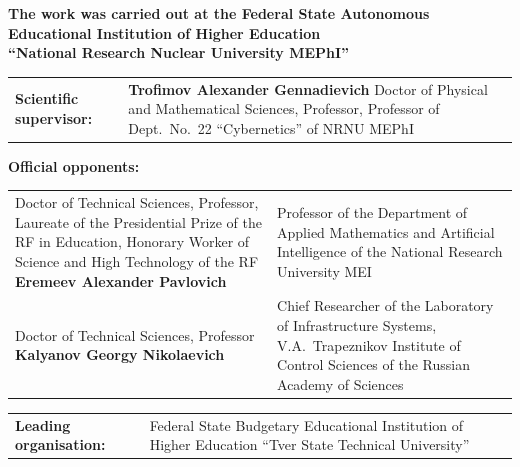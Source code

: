 \documentclass[12pt,a5paper]{article}
\begin{document}
{\footnotesize
\begin{center}
\textbf{The work was carried out at the Federal State Autonomous\\
Educational Institution of Higher Education\\
``National Research Nuclear University MEPhI''}
\end{center}

\vspace{0.2cm}

\noindent\begin{tabular}{@{}p{3cm}p{7.2cm}@{}}
\textbf{Scientific supervisor:} & \textbf{Trofimov Alexander Gennadievich} \newline Doctor of Physical and Mathematical Sciences, Professor, Professor of Dept.\ No.~22 ``Cybernetics'' of NRNU MEPhI \\
\end{tabular}

\vspace{0.2cm}

\noindent\textbf{Official opponents:}
\vspace{0.05cm}

\noindent\begin{tabular}{@{}p{3cm}p{7.2cm}@{}}
Doctor of Technical Sciences, Professor, Laureate of the Presidential Prize of the RF in Education, Honorary Worker of Science and High Technology of the RF \newline \textbf{Eremeev Alexander Pavlovich} &
Professor of the Department of Applied Mathematics and Artificial Intelligence of the National Research University MEI \\[0.15cm]

Doctor of Technical Sciences, Professor \newline \textbf{Kalyanov Georgy Nikolaevich} &
Chief Researcher of the Laboratory of Infrastructure Systems, V.A.~Trapeznikov Institute of Control Sciences of the Russian Academy of Sciences \\
\end{tabular}

\vspace{0.2cm}

\noindent\begin{tabular}{@{}p{3cm}p{7.2cm}@{}}
\textbf{Leading organisation:} & Federal State Budgetary Educational Institution of Higher Education ``Tver State Technical University'' \\
\end{tabular}

}
\end{document}
